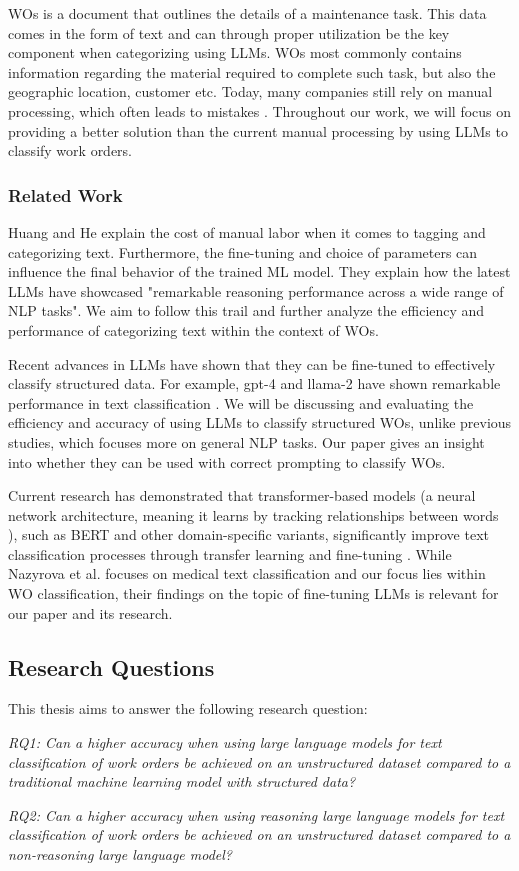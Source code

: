 WOs is a document that outlines the details of a maintenance task. This data
comes in the form of text and can through proper utilization be the key
component when categorizing using LLMs. WOs most commonly contains information regarding
the material required to complete such task, but also the geographic location, customer
etc. Today, many companies still rely on manual processing, which often leads to
mistakes \cite{ibm2023} \cite{li2024}. Throughout our work, we will focus on
providing a better solution than the current manual processing by using LLMs to
classify work orders.

\subsubsection{Related Work}

Huang and He \cite{huang2024} explain the cost of manual labor when it comes to tagging
and categorizing text. Furthermore, the fine-tuning and choice of parameters can
influence the final behavior of the trained ML model. They explain how the
latest LLMs have showcased "remarkable reasoning performance across a wide range
of NLP tasks". We aim to follow this trail and further analyze the efficiency and
performance of categorizing text within the context of WOs.

\bigskip
Recent advances in LLMs have shown that they can be fine-tuned to effectively classify
structured data. For example, gpt-4 and llama-2 have shown remarkable
performance in text classification \cite{zhang2024}. We will be discussing and
evaluating the efficiency and accuracy of using LLMs to classify structured WOs,
unlike previous studies, which focuses more on general NLP tasks. Our paper gives
an insight into whether they can be used with correct prompting to classify WOs.

\bigskip
Current research has demonstrated that transformer-based models (a neural
network architecture, meaning it learns by tracking relationships between words \cite{merritt2022}),
such as BERT and other domain-specific variants, significantly improve text
classification processes through transfer learning and fine-tuning
\cite{nazyrova2024}. While Nazyrova et al. focuses on medical text
classification and our focus lies within WO classification, their findings on the
topic of fine-tuning LLMs is relevant for our paper and its research.

\subsection{Research Questions}

This thesis aims to answer the following research question:

\bigskip
\textit{RQ1: Can a higher accuracy when using large language models for text classification
of work orders be achieved on an unstructured dataset compared to a traditional machine
learning model with structured data?}

\bigskip
\textit{RQ2: Can a higher accuracy when using reasoning large language models for
text classification of work orders be achieved on an unstructured dataset compared
to a non-reasoning large language model?}